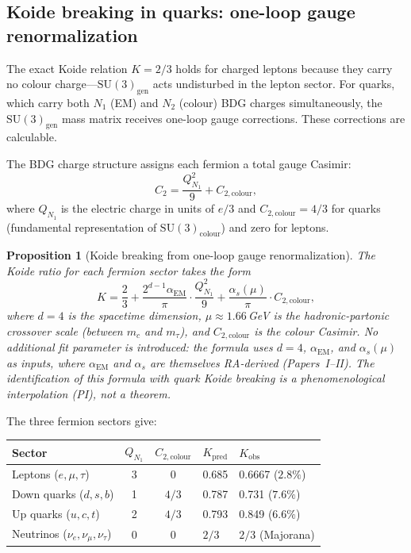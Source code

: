 \documentclass[11pt]{article}
\newtheorem{proposition}{Proposition}
\begin{document}
\subsection{Koide breaking in quarks: one-loop gauge renormalization}

The exact Koide relation $K=2/3$ holds for charged leptons because they carry no colour charge---$\mathrm{SU}(3)_{\mathrm{gen}}$ acts undisturbed in the lepton sector. For quarks, which carry both $N_1$ (EM) and $N_2$ (colour) BDG charges simultaneously, the $\mathrm{SU}(3)_{\mathrm{gen}}$ mass matrix receives one-loop gauge corrections. These corrections are calculable.

The BDG charge structure assigns each fermion a total gauge Casimir:
\begin{equation}
C_2 = \frac{Q_{N_1}^2}{9}+C_{2,\mathrm{colour}},
\end{equation}
where $Q_{N_1}$ is the electric charge in units of $e/3$ and $C_{2,\mathrm{colour}}=4/3$ for quarks (fundamental representation of $\mathrm{SU}(3)_{\mathrm{colour}}$) and zero for leptons.

\begin{proposition}[Koide breaking from one-loop gauge renormalization]
\label{prop:koide_breaking}
The Koide ratio for each fermion sector takes the form
\begin{equation}
K = \frac{2}{3} + \frac{2^{d-1}\alpha_{\mathrm{EM}}}{\pi}\cdot\frac{Q_{N_1}^2}{9} + \frac{\alpha_s(\mu)}{\pi}\cdot C_{2,\mathrm{colour}},
\end{equation}
where $d=4$ is the spacetime dimension, $\mu\approx 1.66$\,GeV is the hadronic-partonic crossover scale (between $m_c$ and $m_\tau$), and $C_{2,\mathrm{colour}}$ is the colour Casimir. No additional fit parameter is introduced: the formula uses $d=4$, $\alpha_{\mathrm{EM}}$, and $\alpha_s(\mu)$ as inputs, where $\alpha_{\mathrm{EM}}$ and $\alpha_s$ are themselves RA-derived (Papers~I--II). The identification of this formula with quark Koide breaking is a phenomenological interpolation (PI), not a theorem.
\end{proposition}

The three fermion sectors give:
\begin{center}
\begin{tabular}{lccll}
\toprule
Sector & $Q_{N_1}$ & $C_{2,\mathrm{colour}}$ & $K_{\mathrm{pred}}$ & $K_{\mathrm{obs}}$ \\
\midrule
Leptons ($e,\mu,\tau$) & 3 & 0 & 0.685 & 0.6667 ($2.8\%$) \\
Down quarks ($d,s,b$) & 1 & $4/3$ & 0.787 & 0.731 ($7.6\%$) \\
Up quarks ($u,c,t$) & 2 & $4/3$ & 0.793 & 0.849 ($6.6\%$) \\
Neutrinos ($\nu_e,\nu_\mu,\nu_\tau$) & 0 & 0 & $2/3$ & $2/3$ (Majorana) \\
\bottomrule
\end{tabular}
\end{center}
\end{document}
